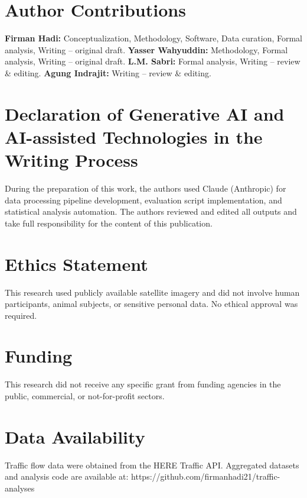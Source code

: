 \documentclass[12pt,a4paper]{article}
\begin{document}
\section*{Author Contributions}

\textbf{Firman Hadi:} Conceptualization, Methodology, Software, Data curation, Formal analysis, Writing -- original draft. \textbf{Yasser Wahyuddin:} Methodology, Formal analysis, Writing -- original draft. \textbf{L.M. Sabri:} Formal analysis, Writing -- review \& editing. \textbf{Agung Indrajit:} Writing -- review \& editing.



\section*{Declaration of Generative AI and AI-assisted Technologies in the Writing Process}

During the preparation of this work, the authors used Claude (Anthropic) for data processing pipeline development, evaluation script implementation, and statistical analysis automation. The authors reviewed and edited all outputs and take full responsibility for the content of this publication.



\section*{Ethics Statement}

This research used publicly available satellite imagery and did not involve human participants, animal subjects, or sensitive personal data. No ethical approval was required.



\section*{Funding}

This research did not receive any specific grant from funding agencies in the public, commercial, or not-for-profit sectors.



\section*{Data Availability}

Traffic flow data were obtained from the HERE Traffic API. Aggregated datasets and analysis code are available at: https://github.com/firmanhadi21/traffic-analyses
\end{document}
